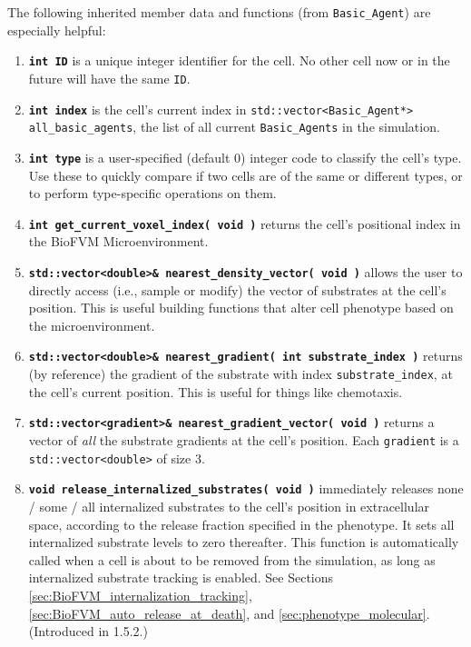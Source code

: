 \documentclass[12pt]{article}
\renewcommand{\v}{\verb}
\newcommand{\smallcode}[1]{\textbf{\texttt{#1}}}
\begin{document}
The following inherited member data and functions (from \v|Basic_Agent|) 
are especially helpful: 

\begin{enumerate}
\item 
\smallcode{int ID} is a unique integer identifier for the cell. No other 
cell now or in the future will have the same \v|ID|.

\item 
\smallcode{int index} is the cell's current index in 
\v|std::vector<Basic_Agent*> all_basic_agents|, the list of all 
current \v|Basic_Agents| in the simulation. 

\item 
\smallcode{int type} is a user-specified (default 0) integer code 
to classify the cell's type. Use these to quickly compare if two 
cells are of the same or different types, or to perform 
type-specific operations on them. 

\item 
\smallcode{int get\_current\_voxel\_index( void )} returns the 
cell's positional index in the BioFVM Microenvironment. 

\item 
\smallcode{std::vector<double>\& nearest\_density\_vector( void )} allows 
the user to directly access (i.e., sample or modify) the vector 
of substrates at the cell's position. This is useful building 
functions that alter cell phenotype based on the microenvironment. 

\item 
\smallcode{std::vector<double>\& nearest\_gradient( int substrate\_index )} 
returns (by reference) the gradient of the substrate with index 
\v|substrate_index|, at the cell's current position. 
This is useful for things like chemotaxis. 

\item 
\smallcode{std::vector<gradient>\& nearest\_gradient\_vector( void )} 
returns a vector of \emph{all} the substrate gradients at the 
cell's position. Each \v|gradient| is a 
\v|std::vector<double>| of size 3. 

\item
\smallcode{void release\_internalized\_substrates( void )} immediately 
releases none / some / all internalized substrates to the cell's position 
in extracellular space, according to the release fraction specified in the 
phenotype. It sets all internalized substrate levels to zero thereafter. 
This function is automatically called when a cell is about to be removed 
from the simulation, as long as internalized substrate tracking is enabled. 
See Sections \ref{sec:BioFVM_internalization_tracking}, 
\ref{sec:BioFVM_auto_release_at_death}, and \ref{sec:phenotype_molecular}. 
(Introduced in 1.5.2.) 

\end{enumerate}
 
\end{document}
